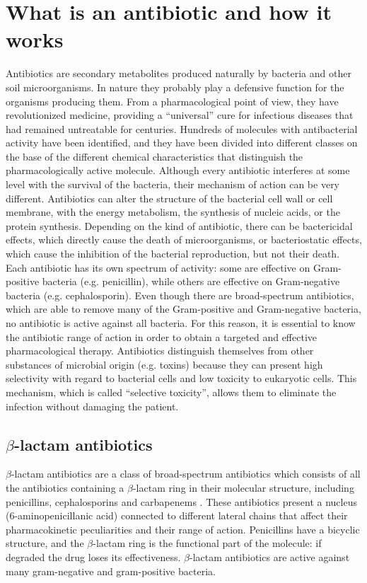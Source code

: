 \documentclass[11pt]{report}
\begin{document}
\chapter{What is an antibiotic and how it works}
Antibiotics are secondary metabolites produced naturally by bacteria and other soil microorganisms. In nature they probably play a defensive function for the organisms producing them. From a pharmacological point of view, they have revolutionized medicine, providing a “universal” cure for infectious diseases that had remained untreatable for centuries. Hundreds of molecules with antibacterial activity have been identified, and they have been divided into different classes on the base of the different chemical characteristics that distinguish the pharmacologically active molecule. Although every antibiotic interferes at some level with the survival of the bacteria, their mechanism of action can be very different. Antibiotics can alter the structure of the bacterial cell wall or cell membrane, with the energy metabolism, the synthesis of nucleic acids, or the protein synthesis.
Depending on the kind of antibiotic, there can be bactericidal effects, which directly cause the death of microorganisms, or bacteriostatic effects, which cause the inhibition of the bacterial reproduction, but not their death.
Each antibiotic has its own spectrum of activity: some are effective on Gram-positive bacteria (e.g. penicillin), while others are effective on Gram-negative bacteria (e.g. cephalosporin). Even though there are broad-spectrum antibiotics, which are able to remove many of the Gram-positive and Gram-negative bacteria, no antibiotic is active against all bacteria. For this reason, it is essential to know the antibiotic range of action in order to obtain a targeted and effective pharmacological therapy.
Antibiotics distinguish themselves from other substances of microbial origin (e.g. toxins) because they can present high selectivity with regard to bacterial cells and low toxicity to eukaryotic cells. This mechanism, which is called “selective toxicity”, allows them to eliminate the infection without damaging the patient.

\section{$\beta$-lactam antibiotics}
$\beta$-lactam antibiotics are a class of broad-spectrum antibiotics which consists of all the antibiotics containing a $\beta$-lactam ring in their molecular structure, including penicillins, cephalosporins and carbapenems \cite{Pitout2005}. 
These antibiotics present a nucleus (6-aminopenicillanic acid) connected to different lateral chains that affect their pharmacokinetic peculiarities and their range of action.
Penicillins have a bicyclic structure, and the $\beta$-lactam ring is the functional part of the molecule: if degraded the drug loses its effectiveness.
$\beta$-lactam antibiotics are active against many gram-negative and gram-positive bacteria.
\end{document}
